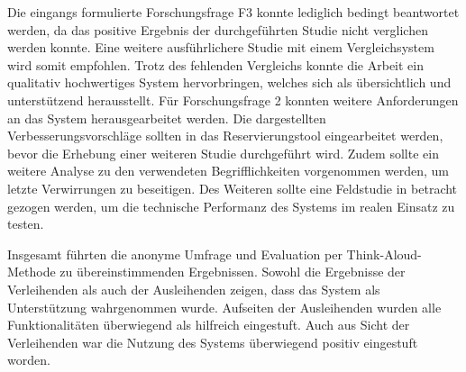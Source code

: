 Die eingangs formulierte Forschungsfrage F3 konnte lediglich bedingt beantwortet werden, da das
positive Ergebnis der durchgeführten Studie nicht verglichen werden konnte. Eine weitere
ausführlichere Studie mit einem Vergleichsystem wird somit empfohlen. Trotz des fehlenden Vergleichs
konnte die Arbeit ein qualitativ hochwertiges System hervorbringen, welches sich als übersichtlich
und unterstützend herausstellt. Für Forschungsfrage 2 konnten weitere Anforderungen an das System
herausgearbeitet werden. Die dargestellten Verbesserungsvorschläge sollten in das Reservierungstool
eingearbeitet werden, bevor die Erhebung einer weiteren Studie durchgeführt wird. Zudem sollte ein
weitere Analyse zu den verwendeten Begrifflichkeiten vorgenommen werden, um letzte Verwirrungen zu
beseitigen. Des Weiteren sollte eine Feldstudie in betracht gezogen werden, um die technische
Performanz des Systems im realen Einsatz zu testen.

Insgesamt führten die anonyme Umfrage und Evaluation per Think-Aloud-Methode zu übereinstimmenden
Ergebnissen. Sowohl die Ergebnisse der Verleihenden als auch der Ausleihenden zeigen, dass das
System als Unterstützung wahrgenommen wurde. Aufseiten der Ausleihenden wurden alle Funktionalitäten
überwiegend als hilfreich eingestuft. Auch aus Sicht der Verleihenden war die Nutzung des Systems
überwiegend positiv eingestuft worden.
